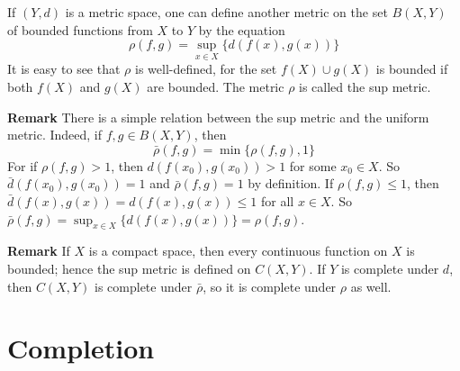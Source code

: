 \documentclass[main.tex]{subfiles}
\begin{document}
\begin{definition}
    If $(Y, d)$ is a metric space, one can define another metric on the set $B(X, Y)$ of bounded functions from $X$ to $Y$ by the equation 
    \begin{equation}
        \rho(f, g) = \sup_{x \in X} \{d(f(x), g(x))\}
    \end{equation}
    It is easy to see that $\rho$ is well-defined, for the set $f(X) \cup g(X)$ is bounded if both $f(X)$ and $g(X)$ are bounded. The metric $\rho$ is called the sup metric. 
\end{definition}
\par \noindent \textbf{Remark} There is a simple relation between the sup metric and the uniform metric. Indeed, if $f, g\in B(X, Y)$, then 
\begin{equation}
    \bar{\rho}(f, g) = \min{\{\rho(f, g), 1\}}
\end{equation}
For if $\rho(f, g) > 1$, then $d(f(x_0), g(x_0)) > 1$ for some $x_0 \in X$. So $\bar{d}(f(x_0), g(x_0)) = 1$ and $\bar{\rho}(f, g) = 1$ by definition. If $\rho(f, g) \leq 1$, then $\bar{d}(f(x), g(x)) = d(f(x), g(x)) \le 1$ for all $x \in X$. So $\bar{\rho}(f, g) = \sup_{x \in X} \{d(f(x), g(x))\} = \rho(f, g)$. 

\par \noindent \textbf{Remark} If $X$ is a compact space, then every continuous function on $X$ is bounded; hence the sup metric is defined on $C(X, Y)$. If $Y$ is complete under $d$, then $C(X, Y)$ is complete under $\bar{\rho}$, so it is complete under $\rho$ as well. 

\section{Completion} 
\end{document}
